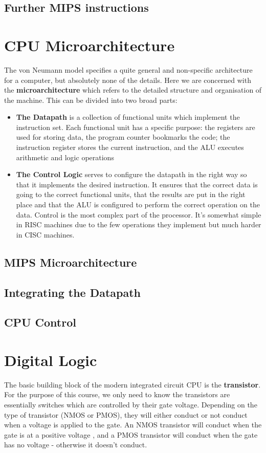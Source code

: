 \documentclass{article}
\begin{document}
	\subsection{Further MIPS instructions}
		
	
	\section{CPU Microarchitecture}
	The von Neumann model specifies a quite general and non-specific architecture for a computer, but absolutely none of the details. Here we are concerned with the \textbf{microarchitecture} which refers to the detailed structure and organisation of the machine. This can be divided into two broad parts:
	\begin{itemize}
		\item \textbf{The Datapath} is a collection of functional units which implement the instruction set. Each functional unit has a specific purpose: the registers are used for storing data, the program counter bookmarks the code; the instruction register stores the current instruction, and the ALU executes arithmetic and logic operations
		
		\item \textbf{The Control Logic} serves to configure the datapath in the right way so that it implements the desired instruction. It ensures that the correct data is going to the correct functional units, that the results are put in the right place and that the ALU is configured to perform the correct operation on the data. Control is the most complex part of the processor. It's somewhat simple in RISC machines due to the few operations they implement but much harder in CISC machines.
	\end{itemize}
	\subsection{MIPS Microarchitecture}
	\subsection{Integrating the Datapath}
	\subsection{CPU Control}
	
	\section{Digital Logic}
	The basic building block of the modern integrated circuit CPU is the \textbf{transistor}. For the purpose of this course, we only need to know the transistors are essentially switches which are controlled by their gate voltage. Depending on the type of transistor (NMOS or PMOS), they will either conduct or not conduct when a voltage is applied to the gate. An NMOS transistor will conduct when the gate is at a positive voltage , and a PMOS transistor will conduct when the gate has no voltage - otherwise it doesn't conduct.
	
\end{document}
